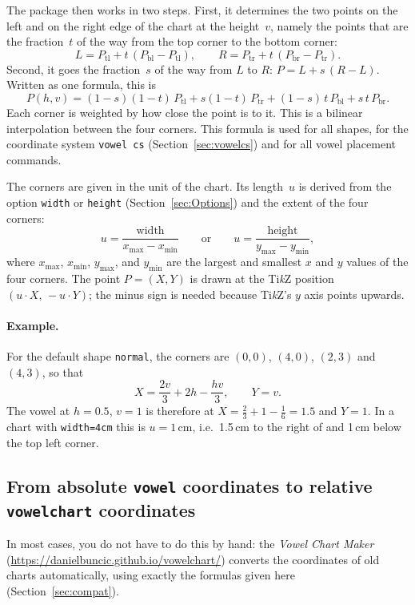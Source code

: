 \documentclass[a4paper,11pt]{article}
\newcommand\opt[1]{\texttt{#1}}
\newcommand\pkg[1]{\texttt{#1}}
\begin{document}
The package then works in two steps. First, it determines the two points on the left and on the right edge of the chart at the height~$v$, namely the points that are the fraction~$t$ of the way from the top corner to the bottom corner:
\[
L=P_\mathrm{tl}+t\,(P_\mathrm{bl}-P_\mathrm{tl}),\qquad
R=P_\mathrm{tr}+t\,(P_\mathrm{br}-P_\mathrm{tr}).
\]
Second, it goes the fraction~$s$ of the way from $L$ to $R$: $P=L+s\,(R-L)$. Written as one formula, this is
\[
P(h,v)=(1-s)(1-t)\,P_\mathrm{tl}+s(1-t)\,P_\mathrm{tr}+(1-s)\,t\,P_\mathrm{bl}+s\,t\,P_\mathrm{br}.
\]
Each corner is weighted by how close the point is to it. This is a bilinear interpolation between the four corners.
This formula is used for all shapes, for the coordinate system \texttt{vowel cs} (Section~\ref{sec:vowelcs}) and for all vowel placement commands.

The corners are given in the unit of the chart. Its length~$u$ is derived from the option \opt{width} or \opt{height} (Section~\ref{sec:Options}) and the extent of the four corners:
\[
u=\frac{\text{width}}{x_{\max}-x_{\min}}\qquad\text{or}\qquad
u=\frac{\text{height}}{y_{\max}-y_{\min}},
\]
where $x_{\max}$, $x_{\min}$, $y_{\max}$, and $y_{\min}$ are the largest and smallest $x$ and $y$ values of the four corners. The point $P=(X,Y)$ is drawn at the Ti\textit{k}Z position $(u\cdot X,\,-u\cdot Y)$; the minus sign is needed because Ti\textit{k}Z's $y$ axis points upwards.

\paragraph{Example.}
For the default shape \opt{normal}, the corners are $(0,0)$, $(4,0)$, $(2,3)$ and $(4,3)$, so that
\[
X=\frac{2v}{3}+2h-\frac{hv}{3},\qquad Y=v.
\]
The vowel at $h=0.5$, $v=1$ is therefore at $X=\tfrac23+1-\tfrac16=1.5$ and $Y=1$. In a chart with \texttt{width=4cm} this is $u=1\,$cm, i.e.\ 1.5\,cm to the right of and 1\,cm below the top left corner.



\subsection{From absolute \pkg{vowel} coordinates to relative \pkg{vowelchart} coordinates}
\label{sec:vowel2rel}

In most cases, you do not have to do this by hand: the \textit{Vowel Chart Maker} (\url{https://danielbuncic.github.io/vowelchart/}) converts the coordinates of old charts automatically, using exactly the formulas given here (Section~\ref{sec:compat}).
\end{document}
